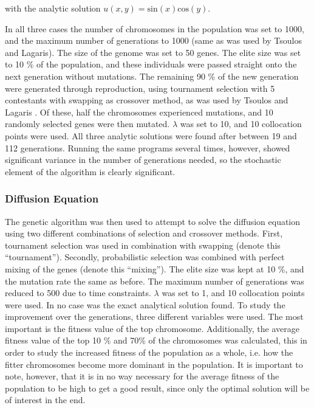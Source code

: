 \documentclass[multicolumn, 9pt]{extarticle}
\begin{document}
with the analytic solution $u(x, y) = \text{sin}(x)\text{cos}(y)$.

In all three cases the number of chromosomes in the population was set to 1000, and the maximum number of generations to 1000 (same as was used by Tsoulos and Lagaris). The size of the genome was set to 50 genes. The elite size was set to 10 \% of the population, and these individuals were passed straight onto the next generation without mutations. The remaining 90 \% of the new generation were generated through reproduction, using tournament selection with 5 contestants with swapping as crossover method, as was used by Tsoulos and Lagaris \cite{Lagaris}. Of these, half the chromosomes experienced mutations, and 10 randomly selected genes were then mutated. $\lambda$ was set to 10, and 10 collocation points were used. All three analytic solutions were found after between 19 and 112 generations. Running the same programs several times, however, showed significant variance in the number of generations needed, so the stochastic element of the algorithm is clearly significant.

\subsubsection{Diffusion Equation}
The genetic algorithm was then used to attempt to solve the diffusion equation using two different combinations of selection and crossover methods. First, tournament selection was used in combination with swapping (denote this ``tournament''). Secondly, probabilistic selection was combined with perfect mixing of the genes (denote this ``mixing''). The elite size was kept at 10 \%, and the mutation rate the same as before. The maximum number of generations was reduced to 500 due to time constraints. $\lambda$ was set to 1, and 10 collocation points were used. In no case was the exact analytical solution found. To study the improvement over the generations, three different variables were used. The most important is the fitness value of the top chromosome. Additionally, the average fitness value of the top 10 \% and 70\% of the chromosomes was calculated, this in order to study the increased fitness of the population as a whole, i.e. how the fitter chromosomes become more dominant in the population. It is important to note, however, that it is in no way necessary for the average fitness of the population to be high to get a good result, since only the optimal solution will be of interest in the end.
\end{document}
